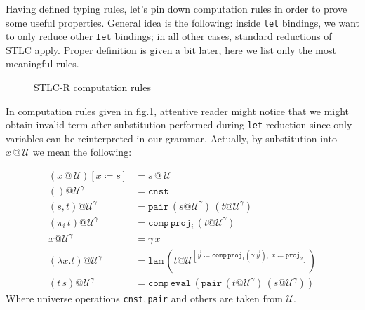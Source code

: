 \documentclass[acmsmall, review, screen, authorversion]{acmart}
\begin{document}
Having defined typing rules, let's pin down computation rules in
order to prove some useful properties. General idea is the following:
inside \texttt{let} bindings, we want to only reduce other
$\texttt{let}$ bindings; in all other cases, standard reductions of
STLC apply. Proper definition is given a bit later, here we list only
the most meaningful rules.

\begin{figure}[h]
    \centering
    \caption{STLC-R computation rules}
    \label{stlc-r-comp}
\end{figure}

In computation rules given in fig.\ref{stlc-r-comp}, attentive reader
might notice that we might obtain invalid term after substitution
performed during \texttt{let}-reduction since only variables can be
reinterpreted in our grammar. Actually, by substitution into
$x\,@\,\mathcal{U}$ we mean the following:

\begin{definition}
\begin{align*}
(x\,@\,\mathcal{U})[x\coloneqq s] &= s\,@\,\mathcal{U}\\
()@\mathcal{U}^\gamma &= \mathtt{cnst}\\
(s,t)@\mathcal{U}^\gamma &= \mathtt{pair}\,
    (s@\mathcal{U}^\gamma)\,(t@\mathcal{U}^\gamma)\\
(\pi_i\,t)@\mathcal{U}^\gamma &= \mathtt{comp}\,
    \mathtt{proj}_i\,(t@\mathcal{U}^\gamma)\\
x@\mathcal{U}^\gamma &= \gamma\,x \\
(\lambda x.t)@\mathcal{U}^\gamma &=
    \mathtt{lam}\,\left(t@\mathcal{U}^{\left[
        \vec{y}\coloneqq
            \mathtt{comp}\,
                \mathtt{proj}_1(\gamma\,\vec{y}),\;
        x\coloneqq\mathtt{proj}_2
    \right]}\right)\\
(t\,s)@\mathcal{U}^\gamma &= \mathtt{comp}\,
    \mathtt{eval}\,(\mathtt{pair}\,
        (t@\mathcal{U}^\gamma)\,
        (s@\mathcal{U}^\gamma))
\end{align*}
Where universe operations \texttt{cnst},\,\texttt{pair} and others
are taken from $\mathcal{U}$.
\end{definition}
\end{document}
